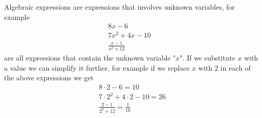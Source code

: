 %
%
%
%

Algebraic expressions are expressions that involves unknown variables, for example
\begin{align*}
8x - 6               &   \\
7x^2 + 4x - 10       &  \\
\frac{x-1}{x^2 + 12} &
\end{align*}
are all expressions that contain the unknown variable "$x$". If we substitute $x$ with a value we can simplify it further, for example if we replace $x$ with $2$ in each of the above expressions we get
\begin{align*}
8 \cdot 2 - 6 = 10                \\
7 \cdot 2^2 + 4 \cdot 2 - 10 = 26 \\
\frac{2-1}{2^2 + 12} = \frac{1}{16}
\end{align*}

